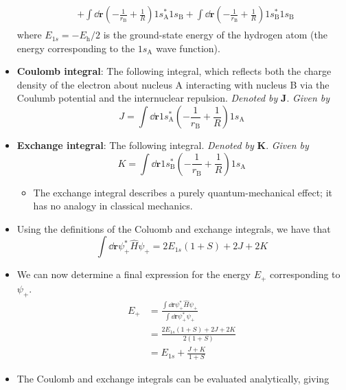 \documentclass[../notes.tex]{subfiles}
\begin{document}
\begin{itemize}
\begin{align*}
\begin{split}
            & +\int\dd{\mathbf{r}}\left( -\frac{1}{r_\text{B}}+\frac{1}{R} \right)1s_\text{A}^*1s_\text{B}+\int\dd{\mathbf{r}}\left( -\frac{1}{r_\text{B}}+\frac{1}{R} \right)1s_\text{B}^*1s_\text{B}
        \end{split}
    \end{align*}
    where $E_{1s}=-E_\text{h}/2$ is the ground-state energy of the hydrogen atom (the energy corresponding to the $1s_\text{A}$ wave function).
    \item \textbf{Coulomb integral}: The following integral, which reflects both the charge density of the electron about nucleus A interacting with nucleus B via the Coulumb potential and the internuclear repulsion. \emph{Denoted by} $\bm{J}$. \emph{Given by}
    \begin{equation*}
        J = \int\dd{\mathbf{r}}1s_\text{A}^*\left( -\frac{1}{r_\text{B}}+\frac{1}{R} \right)1s_\text{A}
    \end{equation*}
    \item \textbf{Exchange integral}: The following integral. \emph{Denoted by} $\bm{K}$. \emph{Given by}
    \begin{equation*}
        K = \int\dd{\mathbf{r}}1s_\text{B}^*\left( -\frac{1}{r_\text{B}}+\frac{1}{R} \right)1s_\text{A}
    \end{equation*}
    \begin{itemize}
        \item The exchange integral describes a purely quantum-mechanical effect; it has no analogy in classical mechanics.
    \end{itemize}
    \item Using the definitions of the Coluomb and exchange integrals, we have that
    \begin{equation*}
        \int\dd{\mathbf{r}}\psi_+^*\hat{H}\psi_+ = 2E_{1s}(1+S)+2J+2K
    \end{equation*}
    \item We can now determine a final expression for the energy $E_+$ corresponding to $\psi_+$.
    \begin{align*}
        E_+ &= \frac{\int\dd{\mathbf{r}}\psi_+^*\hat{H}\psi_+}{\int\dd{\mathbf{r}}\psi_+^*\psi_+}\\
        &= \frac{2E_{1s}(1+S)+2J+2K}{2(1+S)}\\
        &= E_{1s}+\frac{J+K}{1+S}
    \end{align*}
    \item The Coulomb and exchange integrals can be evaluated analytically, giving
    \begin{align*}

\end{align*}
\end{itemize}
\end{document}

